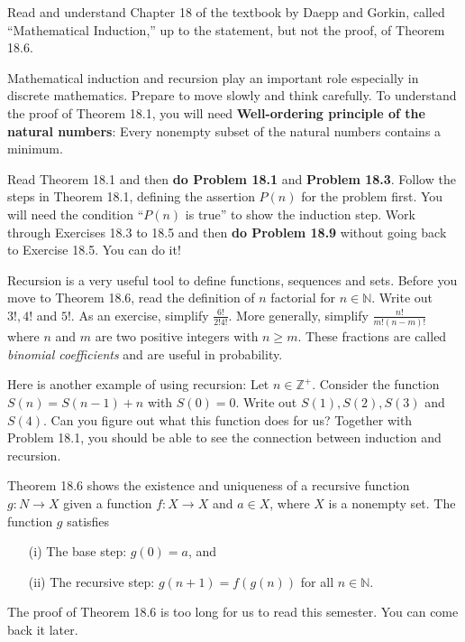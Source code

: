 
Read and understand Chapter 18 of the textbook by Daepp and Gorkin, called ``Mathematical Induction,'' up to the statement, but not the proof, of Theorem 18.6.

Mathematical induction and recursion play an important role especially in discrete mathematics. Prepare to move slowly and think carefully. To understand the proof of Theorem 18.1, you will need {\bf Well-ordering principle of the natural numbers}: Every nonempty subset of the natural numbers contains a minimum.

Read Theorem 18.1 and then {\bf do Problem 18.1} and {\bf Problem 18.3}. Follow the steps in Theorem 18.1, defining the assertion $P(n)$ for the problem first. You will need the condition ``$P(n)$ is true'' to show the induction step. Work through Exercises 18.3 to 18.5 and then {\bf do Problem 18.9} without going back to Exercise 18.5. You can do it!

Recursion is a very useful tool to define functions, sequences and sets. Before you move to Theorem 18.6, read the definition of $n$ factorial for $n\in \mathbb{N}$. Write out $3!, 4!$ and $5!$.  As an exercise, simplify $\frac{6!}{2!4!}$. More generally, simplify $\frac{n!}{m!(n-m)!}$ where $n$ and $m$ are two positive integers with $n\geq m$. These fractions are called {\em binomial coefficients} and are useful in probability.

Here is another example of using recursion:  
Let $n\in \mathbb{Z^+}$. Consider the function $S(n) = S(n-1) + n$ with $S(0) = 0$. Write out $S(1), S(2), S(3)$ and $S(4)$. Can you figure out what this function does for us?  Together with Problem 18.1, you should be able to see the connection between induction and recursion.

Theorem 18.6 shows the existence and uniqueness of a recursive function $g: N \rightarrow X$ given a function $f: X \rightarrow X$ and $a\in X$, where $X$ is a nonempty set. The function $g$ satisfies
\begin{itemize}
\item[(i)] The base step: $g(0) = a$, and
\item[(ii)] The recursive step: $g(n+1)=f(g(n))$ for all $n \in \mathbb{N}$.
\end{itemize}

\noindent The proof of Theorem 18.6 is too long for us to read this semester.  You can come back it later.

